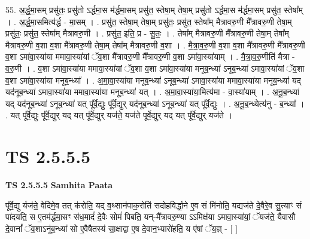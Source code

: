 \documentclass[17pt]{extarticle}
\begin{document}
55. अ॒र्द्ध॒मा॒सम् प्रसु॑तः॒ प्रसु॑तो ऽर्द्धमा॒स म॑र्द्धमा॒सम् प्रसु॑त॒ स्तेषा॒म् तेषा॒म् प्रसु॑तो ऽर्द्धमा॒स म॑र्द्धमा॒सम् प्रसु॑त॒ स्तेषा᳚म् । . अ॒र्द्ध॒मा॒समित्य॑र्द्ध - मा॒सम् । . प्रसु॑त॒ स्तेषा॒म् तेषा॒म् प्रसु॑तः॒ प्रसु॑त॒ स्तेषा᳚म् मैत्रावरु॒णी मै᳚त्रावरु॒णी तेषा॒म् प्रसु॑तः॒ प्रसु॑त॒ स्तेषा᳚म् मैत्रावरु॒णी । . प्रसु॑त॒ इति॒ प्र - सु॒तः॒ । . तेषा᳚म् मैत्रावरु॒णी मै᳚त्रावरु॒णी तेषा॒म् तेषा᳚म् मैत्रावरु॒णी व॒शा व॒शा मै᳚त्रावरु॒णी तेषा॒म् तेषा᳚म् मैत्रावरु॒णी व॒शा । . मै॒त्रा॒व॒रु॒णी व॒शा व॒शा मै᳚त्रावरु॒णी मै᳚त्रावरु॒णी व॒शा ऽमा॑वा॒स्या॑या ममावा॒स्या॑यां ॅव॒शा मै᳚त्रावरु॒णी मै᳚त्रावरु॒णी व॒शा ऽमा॑वा॒स्या॑याम् । . मै॒त्रा॒व॒रु॒णीति॑ मैत्रा - व॒रु॒णी । . व॒शा ऽमा॑वा॒स्या॑या ममावा॒स्या॑यां ॅव॒शा व॒शा ऽमा॑वा॒स्या॑या मनूब॒न्ध्या॑ ऽनूब॒न्ध्या॑ ऽमावा॒स्या॑यां ॅव॒शा व॒शा ऽमा॑वा॒स्या॑या मनूब॒न्ध्या᳚ । . अ॒मा॒वा॒स्या॑या मनूब॒न्ध्या॑ ऽनूब॒न्ध्या॑ ऽमावा॒स्या॑या ममावा॒स्या॑या मनूब॒न्ध्या॑ यद् यद॑नूब॒न्ध्या॑ ऽमावा॒स्या॑या ममावा॒स्या॑या मनूब॒न्ध्या॑ यत् । . अ॒मा॒वा॒स्या॑या॒मित्य॑मा - वा॒स्या॑याम् । . अ॒नू॒ब॒न्ध्या॑ यद् यद॑नूब॒न्ध्या॑ ऽनूब॒न्ध्या॑ यत् पू᳚र्वे॒द्युः पू᳚र्वे॒द्युर् यद॑नूब॒न्ध्या॑ ऽनूब॒न्ध्या॑ यत् पू᳚र्वे॒द्युः । . अ॒नू॒ब॒न्ध्येत्य॑नु - ब॒न्ध्या᳚ । . यत् पू᳚र्वे॒द्युः पू᳚र्वे॒द्युर् यद् यत् पू᳚र्वे॒द्युर् यज॑ते॒ यज॑ते पूर्वे॒द्युर् यद् यत् पू᳚र्वे॒द्युर् यज॑ते । \newline
\pagebreak
{}
\section*{ TS 2.5.5.5 }

\textbf{TS 2.5.5.5 } \newline
\textbf{Samhita Paata} \newline

पू᳚र्वे॒द्यु र्यज॑ते॒ वेदि॑मे॒व तत् क॑रोति॒ यद् व॒थ्सान॑पाक॒रोति॑ सदोहविर्द्धा॒ने ए॒व सं मि॑नोति॒ यद्यज॑ते दे॒वैरे॒व सु॒त्याꣳ सं पा॑दयति॒ स ए॒तम॑र्द्धमा॒सꣳ स॑ध॒मादं॑ दे॒वैः सोमं॑ पिबति॒ यन्-मै᳚त्रावरु॒ण्या ऽऽमिक्ष॑या ऽमावा॒स्या॑यां॒ ॅयज॑ते॒ यैवासौ दे॒वानां᳚ ॅव॒शाऽनू॑ब॒न्ध्या॑ सो ए॒वैषैतस्य॑ सा॒क्षाद्वा ए॒ष दे॒वान॒भ्यारो॑हति॒ य ए॑षां ॅय॒ज्ञ् - [  ] \newline
\end{document}
